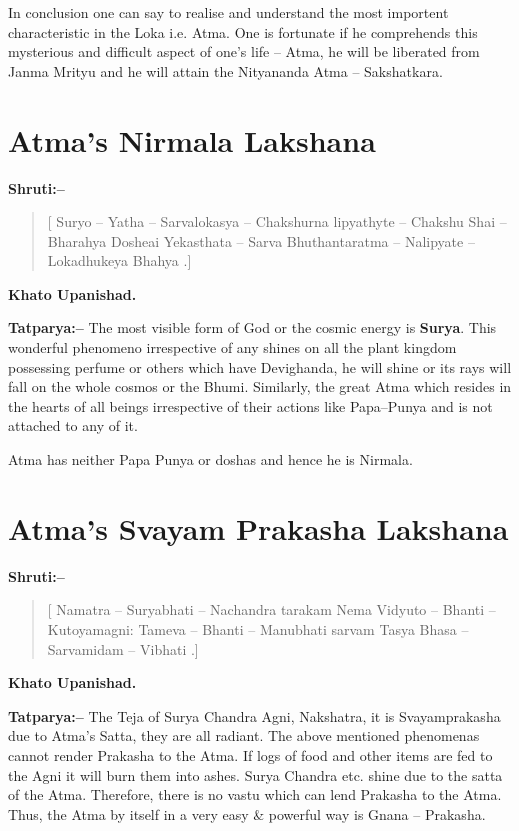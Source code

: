 In conclusion one can say to realise and understand the most importent characteristic in the Loka i.e. Atma. One is fortunate if he comprehends this mysterious and difficult aspect of one's life – Atma, he will be liberated from Janma Mrityu and he will attain the Nityananda Atma – Sakshatkara.

\chapter{Atma's Nirmala Lakshana}

\textbf{Shruti:–}

\begin{verse}
[ Suryo – Yatha – Sarvalokasya – Chakshurna lipyathyte – Chakshu Shai – Bharahya Dosheai  Yekasthata – Sarva Bhuthantaratma – Nalipyate – Lokadhukeya Bhahya .]
\end{verse}

\begin{flushright}
\textbf{Khato Upanishad.}
\end{flushright}

\textbf{Tatparya:–} The most visible form of God or the cosmic energy is \textbf{Surya}. This wonderful phenomeno irrespective of any shines on all the plant kingdom possessing perfume or others which have Devighanda, he will shine or its rays will fall on the whole cosmos or the Bhumi. Similarly, the great Atma which resides in the hearts of all beings irrespective of their actions like Papa–Punya and is not attached to any of it.

Atma has neither Papa Punya or doshas and hence he is Nirmala.

\chapter{Atma's Svayam Prakasha Lakshana}

\textbf{Shruti:–}

\begin{verse}
[ Namatra – Suryabhati – Nachandra tarakam  Nema Vidyuto – Bhanti – Kutoyamagni:  Tameva – Bhanti – Manubhati sarvam  Tasya Bhasa – Sarvamidam – Vibhati .]
\end{verse}

\begin{flushright}
\textbf{Khato Upanishad.}
\end{flushright}

\textbf{Tatparya:–} The Teja of Surya Chandra Agni, Nakshatra, it is Svayamprakasha due to Atma's Satta, they are all radiant. The above mentioned phenomenas cannot render Prakasha to the Atma. If logs of food and other items are fed to the Agni it will burn them into ashes. Surya Chandra etc. shine due to the satta of the Atma. Therefore, there is no vastu which can lend Prakasha to the Atma. Thus, the Atma by itself in a very easy \& powerful way is Gnana – Prakasha.


